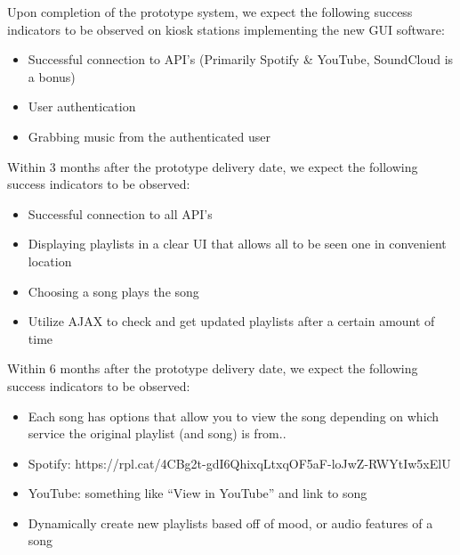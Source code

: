 Upon completion of the prototype system, we expect the following success indicators to be observed on kiosk stations implementing the new GUI software:
\begin{itemize}
  \item Successful connection to API’s (Primarily Spotify & YouTube, SoundCloud is a bonus)
  \item User authentication
  \item Grabbing music from the authenticated user
\end{itemize}

Within 3 months after the prototype delivery date, we expect the following success indicators to be observed:
\begin{itemize}
  \item Successful connection to all API’s
  \item Displaying playlists in a clear UI that allows all to be seen one in convenient location
  \item Choosing a song plays the song
  \item Utilize AJAX to check and get updated playlists after a certain amount of time
\end{itemize}

Within 6 months after the prototype delivery date, we expect the following success indicators to be observed:
\begin{itemize}
  \item Each song has options that allow you to view the song depending on which service the original playlist (and song) is from..
    \item Spotify: https://rpl.cat/4CBg2t-gdI6QhixqLtxqOF5aF-loJwZ-RWYtIw5xElU
    \item YouTube: something like “View in YouTube” and link to song
  \item Dynamically create new playlists based off of mood, or audio features of a song
\end{itemize}

